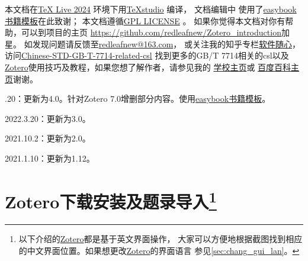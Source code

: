 \documentclass[theorem=false,mathfont=none,openany,sub3section]{easybook}
\begin{document}
本文档在\href{http://tug.org/texlive/}{\TeX{} Live 2024} 环境下用\href{https://texstudio.org/}{TeXstudio}
编译，
文档编辑中
使用了\href{https://ctan.org/pkg/easybook}{easybook书籍模板}在此致谢；
本文档遵循\href{https://www.gnu.org/licenses/gpl-3.0.txt}{GPL LICENSE} 。
如果你觉得本文档对你有帮助，可以到项目的主页
\url{https://github.com/redleafnew/Zotero_introduction}加星。
如发现问题请反馈至\href{mailto:redleafnew@163.com}{redleafnew@163.com}，
或关注我的知乎专栏\href{https://zhuanlan.zhihu.com/c_1071081428967743488}{软件随心}，
访问\href{https://github.com/redleafnew/Chinese-std-GB-T-7714-related-csl}
{Chinese-STD-GB-T-7714-related-csl}
找到更多的GB/T 7714相关的csl以及\href{https://www.zotero.org/}{Zotero}使用技巧及教程，如果您想了解作者，请参见我的
\href{http://food.njau.edu.cn/info/1129/1315.htm}{学校主页}或
\href{https://baike.baidu.com/item/%E9%9F%A9%E6%95%8F%E4%B9%89}{百度百科主页}谢谢。

\tableofcontents

.20：更新为4.0。针对Zotero 7.0增删部分内容。使用\href{https://ctan.org/pkg/easybook}{easybook书籍模板}。

2022.3.20：更新为3.0。

2021.10.2：更新为2.0。

2021.1.10：更新为1.12。

\mainmatter

\chapter[Zotero下载安装及题录导入]{Zotero下载安装及题录导入\footnote{以下介绍的\href{https://www.zotero.org/}{Zotero}都是基于英文界面操作，
    大家可以方便地根据截图找到相应的中文界面位置。如果想更改\href{https://www.zotero.org/}{Zotero}的界面语言
    参见\cref{sec:chang_gui_lan}。}}\label{ch:install}
\end{document}
